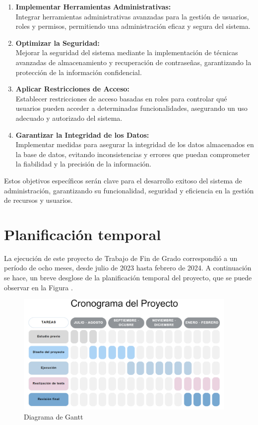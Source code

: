 \documentclass[a4paper, 12pt]{book}
\begin{document}
\begin{enumerate}
  \item \textbf{Implementar Herramientas Administrativas:} \\Integrar herramientas administrativas avanzadas para la gestión de usuarios, roles y permisos, permitiendo una administración eficaz y segura del sistema.
  \item \textbf{Optimizar la Seguridad:} \\Mejorar la seguridad del sistema mediante la implementación de técnicas avanzadas de almacenamiento y recuperación de contraseñas, garantizando la protección de la información confidencial.
  \item \textbf{Aplicar Restricciones de Acceso:} \\Establecer restricciones de acceso basadas en roles para controlar qué usuarios pueden acceder a determinadas funcionalidades, asegurando un uso adecuado y autorizado del sistema.
  \item \textbf{Garantizar la Integridad de los Datos:} \\Implementar medidas para asegurar la integridad de los datos almacenados en la base de datos, evitando inconsistencias y errores que puedan comprometer la fiabilidad y la precisión de la información.
\end{enumerate}

Estos objetivos específicos serán clave para el desarrollo exitoso del sistema de administración, garantizando su funcionalidad, seguridad y eficiencia en la gestión de recursos y usuarios.

\section{Planificación temporal}
\label{sec:planificacion-temporal}
La ejecución de este proyecto de Trabajo de Fin de Grado correspondió a un período de ocho meses, desde julio de 2023 hasta febrero de 2024. A continuación se hace, un breve desglose de la planificación temporal del proyecto, que se puede observar en la Figura \cite{fig:arquitectura}.

\begin{figure}
  \centering
  \includegraphics[width=0.95\textwidth]{img/gann.png}
  \caption{Diagrama de Gantt}
  \label{fig:arquitectura}
\end{figure}
\end{document}
